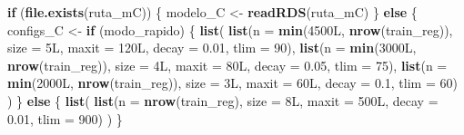 \documentclass[
]{article}
\newenvironment{Shaded}{\begin{snugshade}}{\end{snugshade}}
\newcommand{\AttributeTok}[1]{\textcolor[rgb]{0.13,0.29,0.53}{#1}}
\newcommand{\ControlFlowTok}[1]{\textcolor[rgb]{0.13,0.29,0.53}{\textbf{#1}}}
\newcommand{\DecValTok}[1]{\textcolor[rgb]{0.00,0.00,0.81}{#1}}
\newcommand{\FloatTok}[1]{\textcolor[rgb]{0.00,0.00,0.81}{#1}}
\newcommand{\FunctionTok}[1]{\textcolor[rgb]{0.13,0.29,0.53}{\textbf{#1}}}
\newcommand{\NormalTok}[1]{#1}
\newcommand{\OtherTok}[1]{\textcolor[rgb]{0.56,0.35,0.01}{#1}}
\begin{document}
\begin{Shaded}
\begin{Highlighting}[]
\ControlFlowTok{if}\NormalTok{ (}\FunctionTok{file.exists}\NormalTok{(ruta\_mC)) \{}
\NormalTok{  modelo\_C }\OtherTok{\textless{}{-}} \FunctionTok{readRDS}\NormalTok{(ruta\_mC)}
\NormalTok{\} }\ControlFlowTok{else}\NormalTok{ \{}
\NormalTok{  configs\_C }\OtherTok{\textless{}{-}} \ControlFlowTok{if}\NormalTok{ (modo\_rapido) \{}
    \FunctionTok{list}\NormalTok{(}
      \FunctionTok{list}\NormalTok{(}\AttributeTok{n =} \FunctionTok{min}\NormalTok{(4500L, }\FunctionTok{nrow}\NormalTok{(train\_reg)), }\AttributeTok{size =}\NormalTok{ 5L, }\AttributeTok{maxit =}\NormalTok{ 120L, }\AttributeTok{decay =} \FloatTok{0.01}\NormalTok{, }\AttributeTok{tlim =} \DecValTok{90}\NormalTok{),}
      \FunctionTok{list}\NormalTok{(}\AttributeTok{n =} \FunctionTok{min}\NormalTok{(3000L, }\FunctionTok{nrow}\NormalTok{(train\_reg)), }\AttributeTok{size =}\NormalTok{ 4L, }\AttributeTok{maxit =}\NormalTok{ 80L, }\AttributeTok{decay =} \FloatTok{0.05}\NormalTok{, }\AttributeTok{tlim =} \DecValTok{75}\NormalTok{),}
      \FunctionTok{list}\NormalTok{(}\AttributeTok{n =} \FunctionTok{min}\NormalTok{(2000L, }\FunctionTok{nrow}\NormalTok{(train\_reg)), }\AttributeTok{size =}\NormalTok{ 3L, }\AttributeTok{maxit =}\NormalTok{ 60L, }\AttributeTok{decay =} \FloatTok{0.1}\NormalTok{, }\AttributeTok{tlim =} \DecValTok{60}\NormalTok{)}
\NormalTok{    )}
\NormalTok{  \} }\ControlFlowTok{else}\NormalTok{ \{}
    \FunctionTok{list}\NormalTok{(}
      \FunctionTok{list}\NormalTok{(}\AttributeTok{n =} \FunctionTok{nrow}\NormalTok{(train\_reg), }\AttributeTok{size =}\NormalTok{ 8L, }\AttributeTok{maxit =}\NormalTok{ 500L, }\AttributeTok{decay =} \FloatTok{0.01}\NormalTok{, }\AttributeTok{tlim =} \DecValTok{900}\NormalTok{)}
\NormalTok{    )}
\NormalTok{  \}}


\end{Highlighting}
\end{Shaded}
\end{document}
